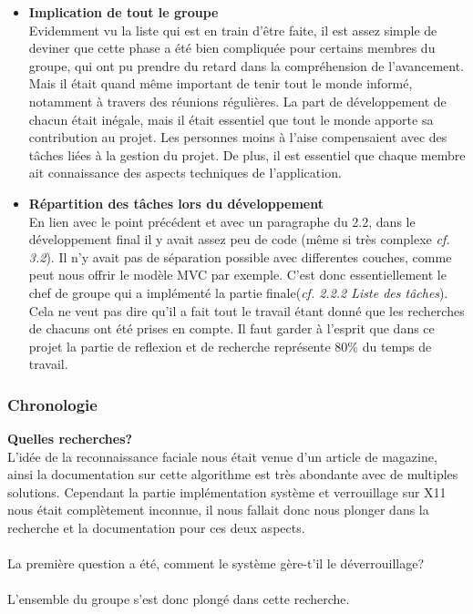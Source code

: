 \documentclass[french]{report}
\begin{document}
\begin{itemize}[label=\textbullet, font=\normalfont \color{blue}]
  \item{\textbf{Implication de tout le groupe}}\\
Evidemment vu la liste qui est en train d'être faite, il est assez simple de deviner
que cette phase a été bien compliquée pour certains membres du groupe, qui ont pu
prendre du retard dans la compréhension de l'avancement. Mais il était quand même
important de tenir tout le monde informé, notamment à travers des réunions régulières.
La part de développement de chacun était inégale, mais il était essentiel que
tout le monde apporte sa contribution au projet. Les personnes moins à l'aise
compensaient avec des tâches liées à la gestion du projet. De plus, il est essentiel que chaque membre ait
connaissance des aspects techniques de l'application.\\

  \item{\textbf{Répartition des tâches lors du développement}}\\
En lien avec le point précédent et avec un paragraphe du 2.2, dans le développement
final il y avait assez peu de code (même si très complexe \emph{cf. 3.2}). Il n'y avait pas de
séparation possible avec differentes couches, comme peut nous offrir le modèle MVC
par exemple. C'est donc essentiellement le chef de groupe qui a implémenté la partie
finale(\emph{cf. 2.2.2 Liste des tâches}). Cela ne veut pas dire qu'il a fait tout
le travail étant donné que les recherches de chacuns ont été prises en compte. Il
faut garder à l'esprit que dans ce projet la partie de reflexion et de recherche
représente 80\% du temps de travail.\\

\end{itemize}

\subsubsection{Chronologie}

\vspace{0.5cm}
\textbf{Quelles recherches?}\\

  L’idée de la reconnaissance faciale nous était venue d’un article de magazine,
  ainsi la documentation sur cette algorithme est très abondante avec de
  multiples solutions. Cependant la partie implémentation système et
  verrouillage sur X11 nous était complètement inconnue, il nous fallait donc
  nous plonger dans la recherche et la documentation pour ces deux aspects.
\\ \\
  La première question a été, comment le système gère-t’il le déverrouillage?
\\ \\
  L’ensemble du groupe s’est donc plongé dans cette recherche.
\end{document}
